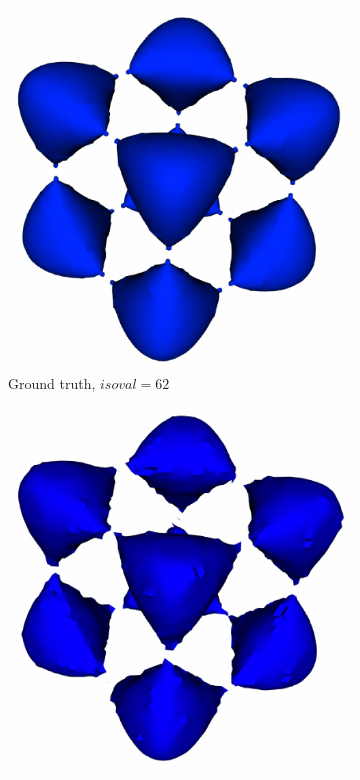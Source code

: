 \begin{figure}[!ht]
\begin{subfigure}{0.195\linewidth}
\centering
\includegraphics[width=0.85\linewidth]{Images/Tangle/gt.pdf}
\vspace{-2mm}
\caption{Ground truth, $isoval=62$}
\label{fig:tangle_gt}
\end{subfigure}
\begin{subfigure}{0.195\linewidth}
\centering
\includegraphics[width=0.85\linewidth]{Images/Tangle/zls.pdf}

\end{subfigure}
\end{figure}
